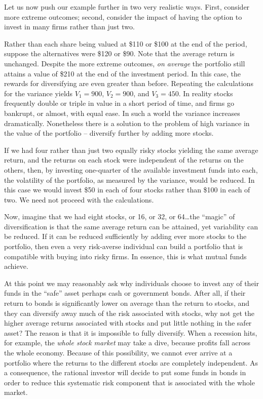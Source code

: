 Let us now push our example further in two very realistic ways. First, consider more extreme outcomes; second, consider the impact of having the option to invest in many firms rather than just two.

Rather than each share being valued at \$110 or \$100 at the end of the period, suppose the alternatives were \$120 or \$90. Note that the average return is unchanged. Despite the more extreme outcomes, \textit{on average} the portfolio still attains a value of \$210 at the end of the investment period. In this case, the rewards for diversifying are even greater than before. Repeating the calculations for the variance yields $V_1=900$, $V_2=900$, and $V_3=450$. In reality stocks frequently double or triple in value in a short period of time, and firms go bankrupt, or almost, with equal ease. In such a world the variance increases dramatically. Nonetheless there is a solution to the problem of high variance in the value of the portfolio -- diversify further by adding more stocks.

If we had four rather than just two equally risky stocks yielding the same average return, and the returns on each stock were independent of the returns on the others, then, by investing one-quarter of the available investment funds into each, the volatility of the portfolio, as measured by the variance, would be reduced. In this case we would invest \$50 in each of four stocks rather than \$100 in each of two. We need not proceed with the calculations. 

Now, imagine that we had eight stocks, or 16, or 32, or 64\dots the ``magic'' of diversification is that the same average return can be attained, yet variability can be reduced. If it can be reduced sufficiently by adding ever more stocks to the portfolio, then even a very risk-averse individual can build a portfolio that is compatible with buying into risky firms. In essence, this is what mutual funds achieve.

At this point we may reasonably ask why individuals choose to invest any of their funds in the ``safe'' asset perhaps cash or government bonds. After all, if their return to bonds is significantly lower on average than the return to stocks, and they can diversify away much of the risk associated with stocks, why not get the higher average returns associated with stocks and put little nothing in the safer asset? The reason is that it is impossible to fully diversify. When a recession hits, for example, the \textit{whole stock market} may take a dive, because profits fall across the whole economy. Because of this possibility, we cannot ever arrive at a portfolio where the returns to the different stocks are completely independent. As a consequence, the rational investor will decide to put some funds in bonds in order to reduce this systematic risk component that is associated with the whole market.

